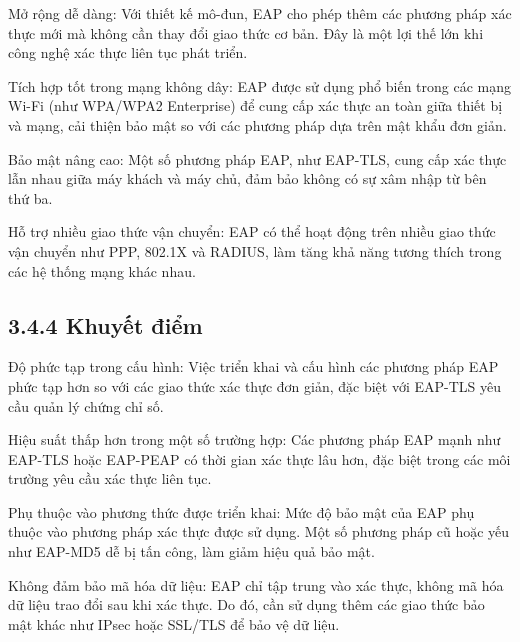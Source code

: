  Mở rộng dễ dàng: Với thiết kế mô-đun, EAP cho phép thêm các phương pháp xác thực mới mà không cần thay đổi giao thức cơ bản. Đây là một lợi thế lớn khi công nghệ xác thực liên tục phát triển.
 
 Tích hợp tốt trong mạng không dây: EAP được sử dụng phổ biến trong các mạng Wi-Fi (như WPA/WPA2 Enterprise) để cung cấp xác thực an toàn giữa thiết bị và mạng, cải thiện bảo mật so với các phương pháp dựa trên mật khẩu đơn giản.

 Bảo mật nâng cao: Một số phương pháp EAP, như EAP-TLS, cung cấp xác thực lẫn nhau giữa máy khách và máy chủ, đảm bảo không có sự xâm nhập từ bên thứ ba.

 Hỗ trợ nhiều giao thức vận chuyển: EAP có thể hoạt động trên nhiều giao thức vận chuyển như PPP, 802.1X và RADIUS, làm tăng khả năng tương thích trong các hệ thống mạng khác nhau.


 \subsection*{3.4.4 Khuyết điểm}

 Độ phức tạp trong cấu hình: Việc triển khai và cấu hình các phương pháp EAP phức tạp hơn so với các giao thức xác thực đơn giản, đặc biệt với EAP-TLS yêu cầu quản lý chứng chỉ số.

 Hiệu suất thấp hơn trong một số trường hợp: Các phương pháp EAP mạnh như EAP-TLS hoặc EAP-PEAP có thời gian xác thực lâu hơn, đặc biệt trong các môi trường yêu cầu xác thực liên tục.

 Phụ thuộc vào phương thức được triển khai: Mức độ bảo mật của EAP phụ thuộc vào phương pháp xác thực được sử dụng. Một số phương pháp cũ hoặc yếu như EAP-MD5 dễ bị tấn công, làm giảm hiệu quả bảo mật.

 Không đảm bảo mã hóa dữ liệu: EAP chỉ tập trung vào xác thực, không mã hóa dữ liệu trao đổi sau khi xác thực. Do đó, cần sử dụng thêm các giao thức bảo mật khác như IPsec hoặc SSL/TLS để bảo vệ dữ liệu.

